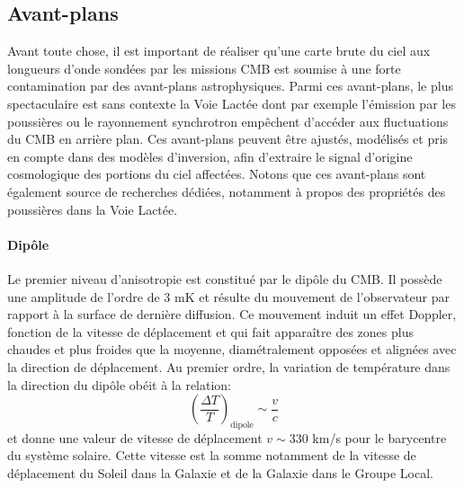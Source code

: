 \subsection{Avant-plans}

Avant toute chose, il est important de réaliser qu'une carte brute du ciel aux longueurs d'onde sondées par les missions CMB est soumise à une forte contamination par des avant-plans astrophysiques. Parmi ces avant-plans, le plus spectaculaire est sans contexte la Voie Lactée dont par exemple l'émission  par les poussières ou le rayonnement synchrotron empêchent d'accéder aux fluctuations du CMB en arrière plan. Ces avant-plans peuvent être ajustés, modélisés et pris en compte dans des modèles d'inversion, afin d'extraire le signal d'origine cosmologique des portions du ciel affectées. Notons que ces avant-plans sont également source de recherches dédiées, notamment à propos des propriétés des poussières dans la Voie Lactée.

\paragraph{Dipôle} Le premier niveau d'anisotropie est constitué par le dipôle du CMB. Il possède une amplitude de l'ordre de 3 mK et résulte du mouvement de l'observateur par rapport à la surface de dernière diffusion. Ce mouvement induit un effet Doppler, fonction de la vitesse de déplacement et qui fait apparaître des zones plus chaudes et plus froides que la moyenne, diamétralement opposées et alignées avec la direction de déplacement. Au premier ordre, la variation de température dans la direction du dipôle obéit à la relation:
\begin{equation}
\left(\frac{\Delta T}{T}\right)_\mathrm{dipole}\sim \frac{v}{c}
\end{equation}
et donne une valeur de vitesse de déplacement $v\sim 330$ km/s pour le barycentre du système solaire. Cette vitesse est la somme notamment de la vitesse de déplacement du Soleil dans la Galaxie et de la Galaxie dans le Groupe Local.

